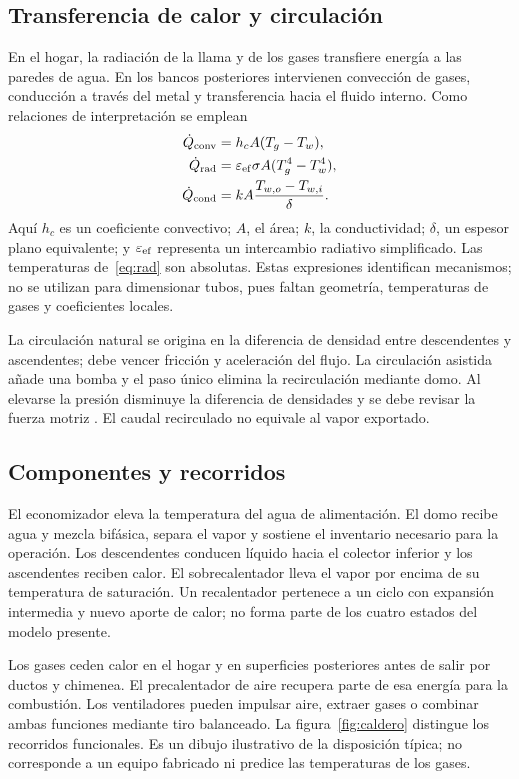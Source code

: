 \documentclass[conference,a4paper,11pt]{IEEEtran}
\begin{document}
\subsection{Transferencia de calor y circulación}
En el hogar, la radiación de la llama y de los gases transfiere energía a las paredes de agua. En los bancos posteriores intervienen convección de gases, conducción a través del metal y transferencia hacia el fluido interno. Como relaciones de interpretación se emplean
\begin{align}
\dot Q_{\rm conv}&=h_c A(T_g-T_w),\label{eq:conv}\\
\dot Q_{\rm rad}&=\varepsilon_{\rm ef}\sigma A(T_g^4-T_w^4),\label{eq:rad}\\
\dot Q_{\rm cond}&=kA\frac{T_{w,o}-T_{w,i}}{\delta}.\label{eq:cond}
\end{align}
Aquí $h_c$ es un coeficiente convectivo; $A$, el área; $k$, la conductividad; $\delta$, un espesor plano equivalente; y $\varepsilon_{\rm ef}$ representa un intercambio radiativo simplificado. Las temperaturas de~\eqref{eq:rad} son absolutas. Estas expresiones identifican mecanismos; no se utilizan para dimensionar tubos, pues faltan geometría, temperaturas de gases y coeficientes locales.

La circulación natural se origina en la diferencia de densidad entre descendentes y ascendentes; debe vencer fricción y aceleración del flujo. La circulación asistida añade una bomba y el paso único elimina la recirculación mediante domo. Al elevarse la presión disminuye la diferencia de densidades y se debe revisar la fuerza motriz \cite{spirax_tubos}. El caudal recirculado no equivale al vapor exportado.

\subsection{Componentes y recorridos}
El economizador eleva la temperatura del agua de alimentación. El domo recibe agua y mezcla bifásica, separa el vapor y sostiene el inventario necesario para la operación. Los descendentes conducen líquido hacia el colector inferior y los ascendentes reciben calor. El sobrecalentador lleva el vapor por encima de su temperatura de saturación. Un recalentador pertenece a un ciclo con expansión intermedia y nuevo aporte de calor; no forma parte de los cuatro estados del modelo presente.

Los gases ceden calor en el hogar y en superficies posteriores antes de salir por ductos y chimenea. El precalentador de aire recupera parte de esa energía para la combustión. Los ventiladores pueden impulsar aire, extraer gases o combinar ambas funciones mediante tiro balanceado. La figura~\ref{fig:caldero} distingue los recorridos funcionales. Es un dibujo ilustrativo de la disposición típica; no corresponde a un equipo fabricado ni predice las temperaturas de los gases.
\end{document}

